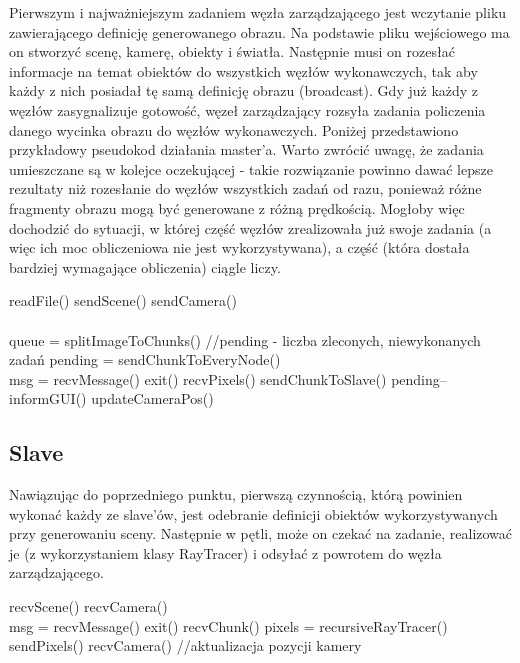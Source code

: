 Pierwszym i najważniejszym zadaniem węzła zarządzającego jest wczytanie pliku zawierającego definicję generowanego obrazu. Na podstawie pliku wejściowego ma on stworzyć scenę, kamerę, obiekty i światła. Następnie musi on rozesłać informacje na temat obiektów do wszystkich węzłów wykonawczych, tak aby każdy z nich posiadał tę samą definicję obrazu (broadcast). Gdy już każdy z węzłów zasygnalizuje gotowość, węzeł zarządzający rozsyła zadania policzenia danego wycinka obrazu do węzłów wykonawczych. Poniżej przedstawiono przykładowy pseudokod działania master'a. Warto zwrócić uwagę, że zadania umieszczane są w kolejce oczekującej - takie rozwiązanie powinno dawać lepsze rezultaty niż rozesłanie do węzłów wszystkich zadań od razu, ponieważ różne fragmenty obrazu mogą być generowane z różną prędkością. Mogłoby więc dochodzić do sytuacji, w której część węzłów zrealizowała już swoje zadania (a więc ich moc obliczeniowa nie jest wykorzystywana), a część (która dostała bardziej wymagające obliczenia) ciągle liczy.

\begin{algorithm}
\begin{algorithmic}
\State readFile()
\State sendScene()
\State sendCamera()
\\
\\
\State queue = splitImageToChunks()
\State //pending - liczba zleconych, niewykonanych zadań
\State pending = sendChunkToEveryNode()
\\
\State msg = recvMessage()
 exit()
	recvPixels()
		sendChunkToSlave()
	\Else
		pending--
	\EndIf
\EndIf
\EndWhile
\State informGUI()
\State updateCameraPos()
\EndWhile
\end{algorithmic}
\end{algorithm}


\subsection{Slave}

Nawiązując do poprzedniego punktu, pierwszą czynnością, którą powinien wykonać każdy ze slave'ów, jest odebranie definicji obiektów wykorzystywanych przy generowaniu sceny. Następnie w pętli, może on czekać na zadanie, realizować je (z wykorzystaniem klasy RayTracer) i odsyłać z powrotem do węzła zarządzającego.

\begin{algorithm}
\begin{algorithmic}
\State recvScene()
\State recvCamera()
\\
\State msg = recvMessage()
 exit()
	recvChunk()
	pixels = recursiveRayTracer()
	sendPixels()
	recvCamera() //aktualizacja pozycji kamery
\EndIf
\EndWhile
\end{algorithmic}
\end{algorithm}


